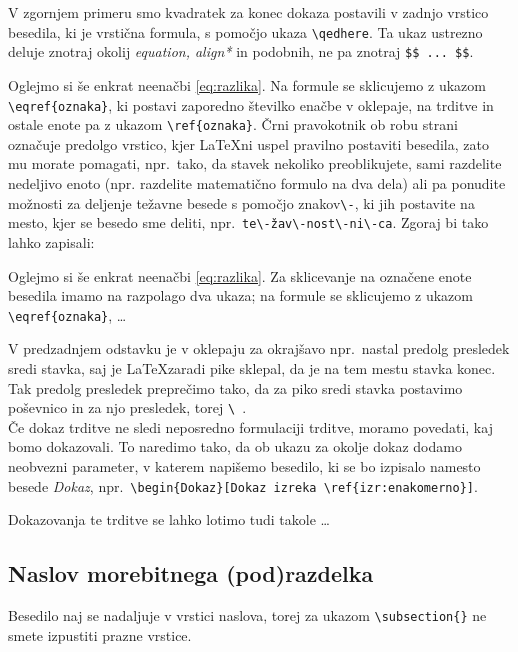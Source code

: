 \documentclass[mat1]{fmfdelo}
\begin{document}
V zgornjem primeru smo kvadratek za konec dokaza postavili v zadnjo vrstico besedila, ki je vrstična formula, s pomočjo ukaza \verb|\qedhere|.  Ta ukaz ustrezno deluje znotraj okolij \emph{equation, align*} in podobnih, ne pa znotraj \verb|$$ ... $$|.

Oglejmo si še enkrat neenačbi \eqref{eq:razlika}. Na formule se sklicujemo z ukazom \verb|\eqref{oznaka}|, ki postavi zaporedno številko enačbe v oklepaje, na trditve in ostale enote pa z ukazom \verb|\ref{oznaka}|. Črni pravokotnik ob robu strani označuje predolgo vrstico, kjer \LaTeX ni uspel pravilno postaviti besedila, zato mu morate pomagati, npr.\ tako, da stavek nekoliko preoblikujete, sami razdelite nedeljivo enoto (npr. razdelite matematično formulo na dva dela) ali pa ponudite možnosti za deljenje težavne besede s pomočjo znakov\verb|\-|, ki jih postavite na mesto, kjer se besedo sme deliti, npr.\  \verb|te\-žav\-nost\-ni\-ca|. Zgoraj bi tako lahko zapisali:

Oglejmo si še enkrat neenačbi \eqref{eq:razlika}. Za sklicevanje na označene enote besedila imamo na razpolago dva ukaza; na formule se sklicujemo z ukazom \verb|\eqref{oznaka}|, \dots

V predzadnjem odstavku je v oklepaju za okrajšavo npr.\ nastal predolg presledek sredi stavka, saj je \LaTeX zaradi pike sklepal, da je na tem mestu stavka konec. Tak predolg presledek preprečimo tako, da za piko sredi stavka postavimo poševnico in za njo presledek, torej \verb|\ |.\\

Če dokaz trditve ne sledi neposredno formulaciji trditve, moramo povedati, kaj bomo dokazovali. To naredimo tako, da ob ukazu za okolje dokaz dodamo neobvezni parameter,  v katerem napišemo besedilo, ki se bo izpisalo namesto besede \emph{Dokaz}, npr.\ \verb|\begin{Dokaz}[Dokaz izreka \ref{izr:enakomerno}]|.

\begin{dokaz}
Dokazovanja te trditve se lahko lotimo tudi takole \ldots
\end{dokaz}

\subsection{Naslov morebitnega (pod)razdelka} Besedilo naj se nadaljuje v vrstici naslova, torej za ukazom \verb|\subsection{}| ne smete izpustiti prazne vrstice.
\end{document}
